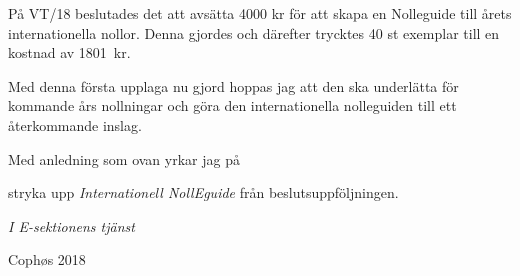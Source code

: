\documentclass[../_main/handlingar.tex]{subfiles}
\begin{document}
På VT/18 beslutades det att avsätta 4000 kr för att skapa en Nolleguide till årets internationella nollor. Denna gjordes och därefter trycktes 40 st exemplar till en kostnad av \SI{1801}{kr}.

Med denna första upplaga nu gjord hoppas jag att den ska underlätta för kommande års nollningar och göra den internationella nolleguiden till ett återkommande inslag.

Med anledning som ovan yrkar jag på 

\begin{attsatser}
    \att stryka upp \emph{Internationell NollEguide} från beslutsuppföljningen.
\end{attsatser}

\begin{signatures}{1}
    \textit{I E-sektionens tjänst}
    \signature{Edvard Carlsson}{Cophøs 2018}
\end{signatures}
\end{document}
